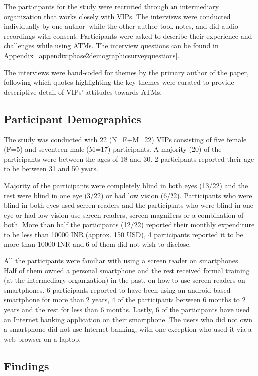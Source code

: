 The participants for the study were recruited through an intermediary organization that works closely with VIPs. The interviews were conducted individually by one author, while the other author took notes, and did audio recordings with consent. Participants were asked to describe their experience and challenges while using ATMs. The interview questions can be found in Appendix~\ref{appendix:phase2demographicsurveyquestions}. 

The interviews were hand-coded for themes by the primary author of the paper, following which quotes highlighting the key themes were curated to provide descriptive detail of VIPs' attitudes towards ATMs.

\subsection{Participant Demographics}
\label{ssec:participantdemographics}

The study was conducted with 22 (N=F+M=22) VIPs consisting of five female (F=5) and seventeen male (M=17) participants. A majority (20) of the participants were between the ages of 18 and 30. 2 participants reported their age to be between 31 and 50 years. 

Majority of the participants were completely blind in both eyes (13/22) and the rest were blind in one eye (3/22) or had low vision (6/22). Participants who were blind in both eyes used screen readers and the participants who were blind in one eye or had low vision use screen readers, screen magnifiers or a combination of both. More than half the participants (12/22) reported their monthly expenditure to be less than 10000 INR (approx. 150 USD), 4 participants reported it to be more than 10000 INR and 6 of them did not wish to disclose. 

All the participants were familiar with using a screen reader on smartphones. Half of them owned a personal smartphone and the rest received formal training (at the intermediary organization) in the past, on how to use screen readers on smartphones. 6 participants reported to have been using an android based smartphone for more than 2 years, 4 of the participants between 6 months to 2 years and the rest for less than 6 months. Lastly, 6 of the participants have used an Internet banking application on their smartphone. The users who did not own a smartphone did not use Internet banking, with one exception who used it via a web browser on a laptop.

\subsection{Findings}
\label{ssec:findings}

